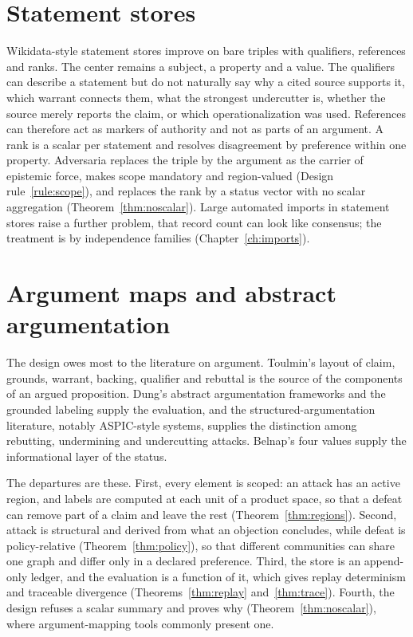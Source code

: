 \section{Statement stores}\label{sec:statements}

Wikidata-style statement stores improve on bare triples with qualifiers, references and ranks. The center remains a subject, a property and a value. The qualifiers can describe a statement but do not naturally say why a cited source supports it, which warrant connects them, what the strongest undercutter is, whether the source merely reports the claim, or which operationalization was used. References can therefore act as markers of authority and not as parts of an argument. A rank is a scalar per statement and resolves disagreement by preference within one property. Adversaria replaces the triple by the argument as the carrier of epistemic force, makes scope mandatory and region-valued (Design rule~\ref{rule:scope}), and replaces the rank by a status vector with no scalar aggregation (Theorem~\ref{thm:noscalar}). Large automated imports in statement stores raise a further problem, that record count can look like consensus; the treatment is by independence families (Chapter~\ref{ch:imports}).

\section{Argument maps and abstract argumentation}\label{sec:argmaps}

The design owes most to the literature on argument. Toulmin's layout of claim, grounds, warrant, backing, qualifier and rebuttal is the source of the components of an argued proposition. Dung's abstract argumentation frameworks and the grounded labeling supply the evaluation, and the structured-argumentation literature, notably ASPIC-style systems, supplies the distinction among rebutting, undermining and undercutting attacks. Belnap's four values supply the informational layer of the status.

The departures are these. First, every element is scoped: an attack has an active region, and labels are computed at each unit of a product space, so that a defeat can remove part of a claim and leave the rest (Theorem~\ref{thm:regions}). Second, attack is structural and derived from what an objection concludes, while defeat is policy-relative (Theorem~\ref{thm:policy}), so that different communities can share one graph and differ only in a declared preference. Third, the store is an append-only ledger, and the evaluation is a function of it, which gives replay determinism and traceable divergence (Theorems~\ref{thm:replay} and~\ref{thm:trace}). Fourth, the design refuses a scalar summary and proves why (Theorem~\ref{thm:noscalar}), where argument-mapping tools commonly present one.

